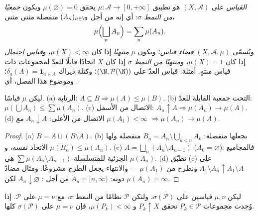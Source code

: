 \begin{definition}\label{def:b3:measure:measure}
\emph{القياس} على $(X, \mathcal A)$ هو تطبيق $\mu \colon \mathcal A \to [0, +\infty]$ يحقق $\mu(\varnothing)
= 0$
ويكون \emph{جمعيًا من النمط $\sigma$}: أي إنه من أجل
$(A_n)_{n\in\N}$ منفصلة مثنى مثنى،
\[
\mu\Bigl(\bigsqcup_n A_n\Bigr) = \sum_n \mu(A_n).
\]
ويُسمّى $(X, \mathcal A, \mu)$ \emph{فضاء قياس}؛ ويكون $\mu$ \emph{منتهيًا} إذا
كان $\mu(X) < \infty$، و\emph{قياس احتمال} إذا كان $\mu(X) = 1$،
و\emph{منتهيًا من النمط $\sigma$} إذا كان $X$ اتحادًا قابلًا للعدّ
لمجموعات ذات قياس منتهٍ. أمثلة: قياس العدّ على $(\N, \mathcal P(\N))$؛ وكتلة
ديراك $\delta_a(A)
= \mathbf 1_{a \in A}$؛ وموضوع هذا الفصل، أي .
\end{definition}

\begin{proposition}\label{prop:b3:measure:basics}
ليكن $\mu$ قياسًا. (a) الرتابة: $A \subseteq B
\Rightarrow \mu(A) \leq \mu(B)$. (b) التحت جمعية
القابلة للعدّ: $\mu(\bigcup A_n) \leq \sum\mu(A_n)$. (c) الاتصال من الأسفل: $A_n \uparrow A \Rightarrow \mu(A_n) \to \mu(A)$. (d) الاتصال من
الأعلى: $A_n \downarrow A$ \emph{مع $\mu(A_1) < \infty$} $\Rightarrow \mu(A_n) \to \mu(A)$.
\end{proposition}

\begin{proof}
(a) $B = A \sqcup (B\setminus A)$. (b) بجعلها منفصلة: $B_n = A_n
\setminus \bigcup_{k<n}A_k$ منفصلة ولها الاتحاد نفسه،
و $\mu(B_n) \leq \mu(A_n)$. (c) $A = \bigsqcup_n (A_n
\setminus A_{n-1})$ ($A_0 = \varnothing$): فالمجاميع الجزئية للمتسلسلة
$\sum\mu(A_n\setminus A_{n-1})$ هي $\mu(A_n)$. (d) نطبّق (c) على $A_1 \setminus A_n \uparrow A_1 \setminus A$ ونطرح من
$\mu(A_1)$ --- والانتهاء يجعل الطرح مشروعًا. ومثال مضادّ دونه:
$A_n = [n, \infty)$ من أجل : $A_n \downarrow \varnothing$ لكن $\mu(A_n) =
\infty$.
\end{proof}

\begin{theorem}[الوحدانية]\label{thm:b3:measure:uniqueness}
ليكن $\mu, \nu$ قياسين على $\sigma(\mathcal P)$، ولتكن $\mathcal
P$ نظامًا من النمط
$\pi$، مع $\mu = \nu$ على $\mathcal P$. إذا وُجدت مجموعات $P_k \in \mathcal P$
تحقق $P_k \uparrow X$ و $\mu(P_k) < \infty$، فإن $\mu = \nu$ على $\sigma(\mathcal P)$ كلها.
\end{theorem}

